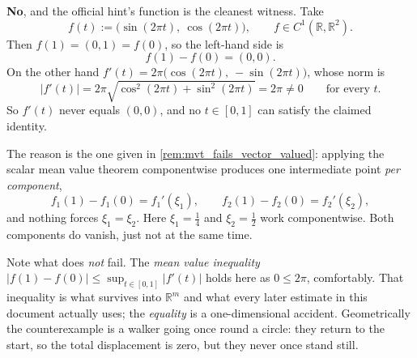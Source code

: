 \begin{exercisesolution}
\label{sol:mean_value_vector_valued}
\textbf{No}, and the official hint's function is the cleanest witness. Take
\[f(t) := \big(\sin(2\pi t),\ \cos(2\pi t)\big), \qquad f \in C^1(\mathbb{R},\mathbb{R}^2).\]
Then $f(1) = (0,1) = f(0)$, so the left-hand side is
\[f(1) - f(0) = (0,0).\]
On the other hand $f'(t) = 2\pi\big(\cos(2\pi t),\ -\sin(2\pi t)\big)$, whose norm is
\[|f'(t)| = 2\pi\sqrt{\cos^2(2\pi t) + \sin^2(2\pi t)} = 2\pi \neq 0
  \qquad \text{for every } t.\]
So $f'(t)$ never equals $(0,0)$, and no $t \in [0,1]$ can satisfy the claimed identity.

The reason is the one given in \cref{rem:mvt_fails_vector_valued}: applying the scalar mean value
theorem componentwise produces one intermediate point \emph{per component},
\[f_1(1)-f_1(0) = f_1'(\xi_1), \qquad f_2(1)-f_2(0) = f_2'(\xi_2),\]
and nothing forces $\xi_1 = \xi_2$. Here $\xi_1 = \tfrac14$ and $\xi_2 = \tfrac12$ work
componentwise. Both components do vanish, just not at the same time.

\begin{ainote}
Note what does \emph{not} fail. The \emph{mean value inequality}
$|f(1)-f(0)| \leq \sup_{t \in [0,1]}|f'(t)|$ holds here as
$0 \leq 2\pi$, comfortably. That inequality is what survives into $\mathbb{R}^m$ and what every
later estimate in this document actually uses; the \emph{equality} is a one-dimensional accident.
Geometrically the counterexample is a walker going once round a circle: they return to the start,
so the total displacement is zero, but they never once stand still.
\end{ainote}
\end{exercisesolution}

